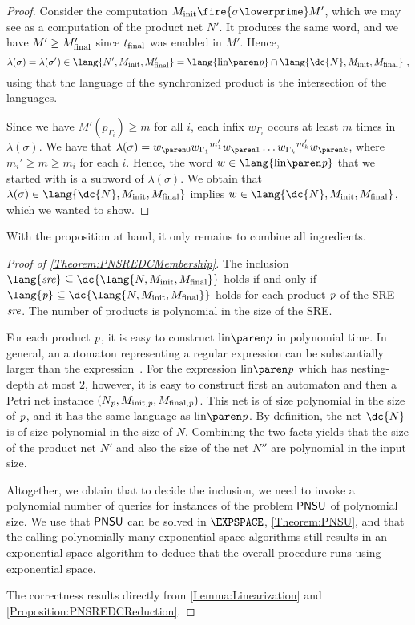 \documentclass[../../diss.tex]{subfiles}
\begin{document}
\begin{proof}
    Consider the computation $\Minit \fire{\sigma\lowerprime} M'$, which we may see as a computation of the product net $N'$.
    It produces the same word, and we have $M' \geq M_{\text{final}}'$ since $t_{\text{final}}$ was enabled in $M'$.
    Hence,
    \[
        \lambda(\sigma) = \lambda(\sigma') \in  \lang{N',\Minit,\Mfinal'} = \lang{\linof{\product}} \cap \lang{\dc{N},\Minit,\Mfinal}
        \ ,
    \]
    using that the language of the synchronized product is the intersection of the languages.

    Since we have $M'(p_{\Gamma_i}) \geq m$ for all $i$, each infix $w_{\Gamma_i}$ occurs at least $m$ times in $\lambda(\sigma)$.
    We have that $\lambda(\sigma) = \dtr{w}{0} {w_{\Gamma_1}}^{m_1'} \dtr{w}{1} \ldots {w_{\Gamma_k}}^{m_k'} \dtr{w}{k}$, where $m_i' \geq m \geq m_i$ for each $i$.
    Hence, the word $w \in \lang{\linof{\product}}$ that we started with is a subword of $\lambda(\sigma)$.
    We obtain that $\lambda(\sigma) \in \lang{\dc{N},\Minit,\Mfinal}$ implies $w \in \lang{\dc{N},\Minit,\Mfinal}$, which we wanted to show.
\end{proof}


With the proposition at hand, it only remains to combine all ingredients.

\begin{proof}[Proof of \cref{Theorem:PNSREDCMembership}]
    The inclusion $\lang{\sre} \subseteq \dc{\lang{N,\Minit,\Mfinal}}$ holds if and only if $\lang{\product} \subseteq \dc{\lang{N,\Minit,\Mfinal}}$ holds for each product $\mathit{p}$ of the SRE $\mathit{sre}$.
    The number of products is polynomial in the size of the SRE.\@

    For each product $\mathit{p}$, it is easy to construct $\linof{\product}$ in polynomial time.
    In general, an automaton representing a regular expression can be substantially larger than the expression~\cite{GruberH15}.
    For the expression $\linof{\product}$ which has nesting-depth at most $2$, however, it is easy to construct first an automaton and then a Petri net instance $(N_{\mathit{p}},M_{{\text{init}},\mathit{p}},M_{{\text{final}},\mathit{p}})$.
    This net is of size polynomial in the size of $\mathit{p}$, and it has the same language as $\linof{\product}$.
    By definition, the net $\dc{N}$ is of size polynomial in the size of $N$.
    Combining the two facts yields that the size of the product net $N'$ and also the size of the net $N''$ are polynomial in the input size.

    Altogether, we obtain that to decide the inclusion, we need to invoke a polynomial number of queries for instances of the problem $\mathsf{PNSU}$ of polynomial size.
    We use that $\mathsf{PNSU}$ can be solved in $\EXPSPACE$, \cref{Theorem:PNSU}, and that the calling polynomially many exponential space algorithms still results in an exponential space algorithm to deduce that the overall procedure runs using exponential space.

    The correctness results directly from \cref{Lemma:Linearization} and \cref{Proposition:PNSREDCReduction}.
\end{proof}
\end{document}

